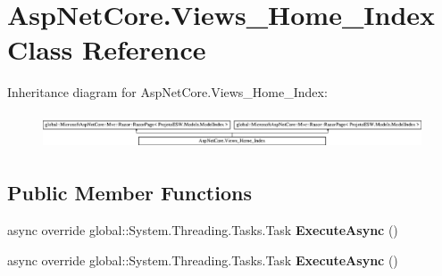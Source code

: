 \hypertarget{class_asp_net_core_1_1_views___home___index}{}\section{Asp\+Net\+Core.\+Views\+\_\+\+Home\+\_\+\+Index Class Reference}
\label{class_asp_net_core_1_1_views___home___index}
Inheritance diagram for Asp\+Net\+Core.\+Views\+\_\+\+Home\+\_\+\+Index\+:\begin{figure}[H]
\begin{center}
\leavevmode
\includegraphics[height=1.066667cm]{class_asp_net_core_1_1_views___home___index}
\end{center}
\end{figure}
\subsection*{Public Member Functions}
\begin{DoxyCompactItemize}
\item 
\mbox{\label{class_asp_net_core_1_1_views___home___index_a2e2b2029628bc7b5b597c00591249147}} 
async override global\+::\+System.\+Threading.\+Tasks.\+Task {\bfseries Execute\+Async} ()
\item 
\mbox{\label{class_asp_net_core_1_1_views___home___index_a2e2b2029628bc7b5b597c00591249147}} 
async override global\+::\+System.\+Threading.\+Tasks.\+Task {\bfseries Execute\+Async} ()
\end{DoxyCompactItemize}
